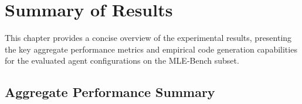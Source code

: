 \chapter{Summary of Results}

This chapter provides a concise overview of the experimental results, presenting the key aggregate performance metrics and empirical code generation capabilities for the evaluated agent configurations on the MLE-Bench subset.

\section{Aggregate Performance Summary}


